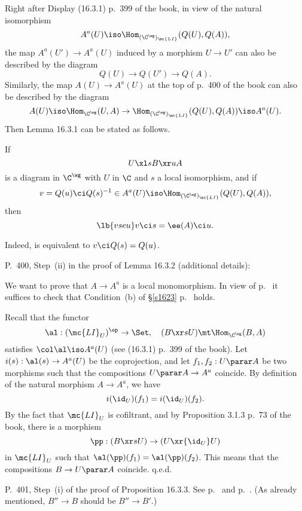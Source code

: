 \documentclass[12pt]{article}
\theoremstyle{remark}
\theoremstyle{definition}
\begin{document}

\begin{s}
Right after Display (16.3.1) p.~399 of the book, in view of the natural isomorphism 
$$
A^a(U)\iso\Hom_{({\C^\wg})_{\mc{LI}}}(Q(U),Q(A)),
$$ 
the map $A^a(U')\to A^a(U)$ induced by a morphism $U\to U'$ can also be described by the diagram 
$$
Q(U)\to Q(U')\to Q(A).
$$ 
Similarly, the map $A(U)\to A^a(U)$ at the top of p.~400 of the book can also be described by the diagram 
$$
A(U)\iso\Hom_{\C^\wg}(U,A)\to\Hom_{({\C^\wg})_{\mc{LI}}}(Q(U),Q(A))\iso A^a(U).
$$ 
Then Lemma 16.3.1 can be stated as follows. 

If 
$$
U\xl sB\xr uA
$$ 
is a diagram in $\C^\wg$ with $U$ in $\C$ and $s$ a local isomorphism, and if 
$$
v=Q(u)\ci Q(s)^{-1}\in A^a(U)\iso\Hom_{({\C^\wg})_{\mc{LI}}}(Q(U),Q(A)), 
$$ 
then 
\begin{equation}\lb{vseu}
v\ci s=\ee(A)\ci u.
\end{equation}

Indeed,  is equivalent to $v\ci Q(s)=Q(u)$.
\end{s}

%

\begin{s} 
P.~400, Step~(ii) in the proof of Lemma 16.3.2 (additional details):

We want to prove that $A\to A^a$ is a local monomorphism. In view of  p.~ it suffices to check that Condition~(b) of \S\ref{s1623} p.~ holds. 

Recall that the functor 
$$
\al:(\mc{LI}_U)^{\op}\to\Set,\quad(B\xr sU)\mt\Hom_{\C^\wg}(B,A)
$$ 
satisfies $\col\al\iso A^a(U)$ (see (16.3.1) p.~399 of the book). Let $i(s):\al(s)\to A^a(U)$ be the coprojection, and let $f_1,f_2:U\parar A$ be two morphisms such that the compositions $U\parar A\to A^a$ coincide. By definition of the natural morphism $A\to A^a$, we have 
$$
i(\id_U)(f_1)=i(\id_U)(f_2).
$$ 
By the fact that $\mc{LI}_U$ is cofiltrant, and by Proposition 3.1.3 p.~73 of the book, there is a morphism 
$$
\pp:(B\xr sU)\to(U\xr{\id_U}U)
$$ 
in $\mc{LI}_U$ such that $\al(\pp)(f_1)=\al(\pp)(f_2)$. This means that the compositions $B\to U\parar A$ coincide. q.e.d.
\end{s}

%

\begin{s} P.~401, Step~(i) of the proof of Proposition 16.3.3. See  p.~ and  p.~. (As already mentioned, $B''\to B$ should be $B''\to B'$.)
\end{s}
\end{document}
